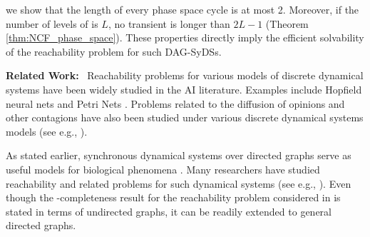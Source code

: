  we show
that the length of every phase space cycle is at most 2.
Moreover, if the number of levels of  \cals{} is $L$,
no transient is longer than $2L-1$
(Theorem \ref{thm:NCF_phase_space}).
These properties
directly imply the efficient solvability of the reachability
problem for such DAG-SyDSs.
\fi

\smallskip

\noindent
\textbf{Related Work:}~ Reachability problems for various
models of discrete dynamical systems have been widely studied
in the AI literature.
Examples include 
Hopfield neural nets \cite{FO-1989,Orponen-1993,Orponen-1994}
and Petri Nets \cite{Esparza-etal-1994}.
Problems related to the diffusion of opinions and other contagions have
also been studied under various discrete dynamical systems
models (see e.g., 
\cite{Auletta-etal-2018,Botan-etal-2019,Chistikov-etal-2020,BE-2017}).

As stated earlier, synchronous dynamical systems over 
directed graphs serve as useful models for biological
phenomena \cite{Kauffman-etal-2003}.
Many researchers have studied reachability and related 
problems for such dynamical systems (see e.g., 
\cite{OU-2020,OU-2017}). 
Even though the \cpsp-completeness result for the reachability problem 
considered in \cite{Rosenkrantz-etal-2018} is stated in terms of undirected
graphs, it can be readily extended to general directed graphs.

